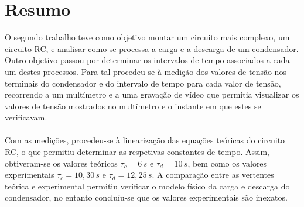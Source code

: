 \section{Resumo}


O segundo trabalho teve como objetivo montar um circuito mais complexo, um circuito RC, e analisar como se processa a carga e a descarga de um condensador. Outro objetivo passou por determinar os intervalos de tempo associados a cada um destes processos.
Para tal procedeu-se à medição dos valores de tensão nos terminais do condensador e do intervalo de tempo para cada valor de tensão, recorrendo a um multímetro e a uma gravação de vídeo que permitia visualizar os valores de tensão mostrados no multímetro e o instante em que estes se verificavam.
\paragraph{}Com as medições, procedeu-se à linearização das equações teóricas do circuito RC, o que permitiu determinar as respetivas constantes de tempo. Assim, obtiveram-se os valores teóricos $\tau_c = 6\,s$ e $\tau_d = 10\,s$, bem como os valores experimentais $\tau_c = 10,30\,s$ e $\tau_d = 12,25\,s$. A comparação entre as vertentes teórica e experimental permitiu verificar o modelo físico da carga e descarga do condensador, no entanto concluíu-se que os valores experimentais são inexatos.